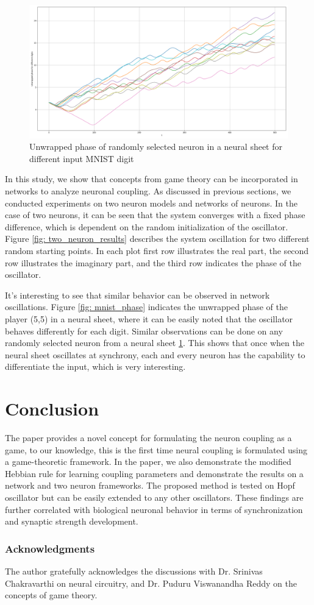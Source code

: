 \documentclass{article}
\begin{document}
\begin{figure}
    \centering
    \includegraphics[width=1.\textwidth]{mnist_phase_random.png}
    \caption{Unwrapped phase of randomly selected neuron in a neural sheet for different input MNIST digit}
    \label{fig: mnist_phase_random}
\end{figure}

In this study, we show that concepts from game theory can be incorporated in networks to analyze neuronal coupling. As discussed in previous sections, we conducted experiments on two neuron models and networks of neurons. In the case of two neurons, it can be seen that the system converges with a fixed phase difference, which is dependent on the random initialization of the oscillator. Figure \ref{fig: two_neuron_results} describes the system oscillation for two different random starting points. In each plot first row illustrates the real part, the second row illustrates the imaginary part, and the third row indicates the phase of the oscillator.

It's interesting to see that similar behavior can be observed in network oscillations. Figure \ref{fig: mnist_phase} indicates the unwrapped phase of the player (5,5) in a neural sheet, where it can be easily noted that the oscillator behaves differently for each digit. Similar observations can be done on any randomly selected neuron from a neural sheet \ref{fig: mnist_phase_random}. This shows that once when the neural sheet oscillates at synchrony, each and every neuron has the capability to differentiate the input, which is very interesting.  


\section{Conclusion}
\label{conc}
The paper provides a novel concept for formulating the neuron coupling as a game, to our knowledge, this is the first time neural coupling is formulated using a game-theoretic framework. In the paper, we also demonstrate the modified Hebbian rule for learning coupling parameters and demonstrate the results on a network and two neuron frameworks. The proposed method is tested on Hopf oscillator but can be easily extended to any other oscillators. These findings are further correlated with biological neuronal behavior in terms of synchronization and synaptic strength development.  

\subsubsection*{Acknowledgments}

The author gratefully acknowledges the discussions with Dr. Srinivas Chakravarthi on neural circuitry, and Dr. Puduru Viswanandha Reddy on the concepts of game theory.



\end{document}
